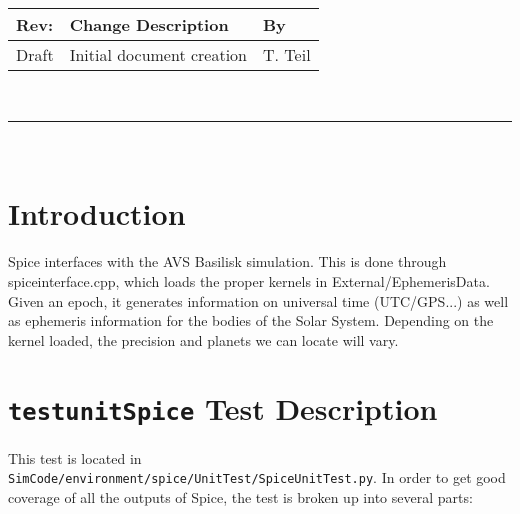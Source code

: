 \documentclass[]{BasiliskReportMemo}
\begin{document}
\makeCover
%
%
\pagestyle{empty}
{\renewcommand{\arraystretch}{1.1}
\noindent
\begin{longtable}{|p{0.5in}|p{4.5in}|p{1.14in}|}
\hline
{\bfseries Rev}: & {\bfseries Change Description} & {\bfseries By} \\
\hline
Draft & Initial document creation & T. Teil \\
\hline

\end{longtable}
}

\newpage
\setcounter{page}{1}
\pagestyle{fancy}

\tableofcontents
~\\ \hrule ~\\



\section{Introduction}
Spice interfaces with the AVS Basilisk simulation. This is done through spice\textunderscore interface.cpp, which loads the proper kernels in External/EphemerisData. Given an epoch, it generates information on universal time (UTC/GPS...) as well as ephemeris information for the bodies of the Solar System. Depending on the kernel loaded, the precision and planets we can locate will vary. 


\section{{\tt test\textunderscore unitSpice} Test Description}

This test is located in {\tt SimCode/environment/spice/UnitTest/SpiceUnitTest.py}. In order to get good coverage of all the outputs of Spice, the test is broken up into several parts: \par
\end{document}
